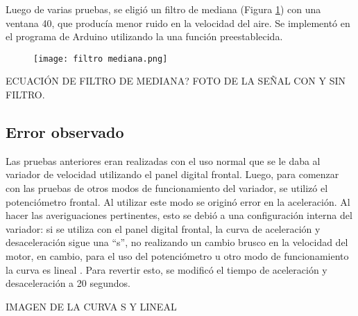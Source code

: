Luego de varias pruebas, se eligió un filtro de mediana (Figura \ref{fig:filtrosm}) con una ventana 40, que producía menor ruido en la velocidad del aire. Se implementó en el programa de Arduino utilizando la una función preestablecida.

\begin{figure}[htb]
	\centering
	\texttt{[image: filtro mediana.png]}
	\label{fig:filtrosm}
\end{figure}

ECUACIÓN DE FILTRO DE MEDIANA?
FOTO DE LA SEÑAL CON Y SIN FILTRO.

\subsection{Error observado}
Las pruebas anteriores eran realizadas con el uso normal que se le daba al variador de velocidad utilizando el panel digital frontal.
Luego, para comenzar con las pruebas de otros modos de funcionamiento del variador, se utilizó el potenciómetro frontal. Al utilizar este modo se originó error en la aceleración.   Al hacer las averiguaciones pertinentes, esto se debió a una configuración interna del variador: si se utiliza con el panel digital frontal, la curva de aceleración y desaceleración sigue una “s”, no realizando un cambio brusco en la velocidad del motor, en cambio, para el uso del potenciómetro u otro modo de funcionamiento la curva es lineal . Para revertir esto, se modificó el tiempo de aceleración y desaceleración a 20 segundos. 

IMAGEN DE LA CURVA S Y LINEAL



\newpage